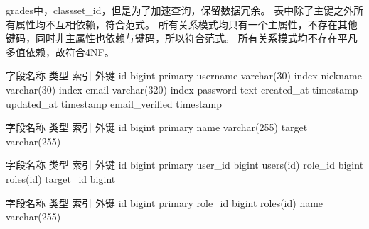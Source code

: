 {}grades中，classset_id，但是为了加速查询，保留数据冗余。\markdownRendererInterblockSeparator
{}\markdownRendererInterblockSeparator
{}表中除了主键之外所有属性均不互相依赖，符合范式。\markdownRendererInterblockSeparator
{}\markdownRendererInterblockSeparator
{}所有关系模式均只有一个主属性，不存在其他键码，同时非主属性也依赖与键码，所以符合范式。\markdownRendererInterblockSeparator
{}\markdownRendererInterblockSeparator
{}所有关系模式均不存在平凡多值依赖，故符合4NF。\markdownRendererInterblockSeparator
{}\markdownRendererInterblockSeparator
{}\markdownRendererInterblockSeparator
{}\begin{center}\markdownRendererInterblockSeparator
{}%
{{字段名称}%
{类型}%
{索引}%
{外键}%
}%
{{id}%
{bigint}%
{primary}%
{}%
}%
{{username}%
{varchar(30)}%
{index}%
{}%
}%
{{nickname}%
{varchar(30)}%
{index}%
{}%
}%
{{email}%
{varchar(320)}%
{index}%
{}%
}%
{{password}%
{text}%
{}%
{}%
}%
{{created\_at}%
{timestamp}%
{}%
{}%
}%
{{updated\_at}%
{timestamp}%
{}%
{}%
}%
{{email\_verified}%
{timestamp}%
{}%
{}%
}%
\markdownRendererInterblockSeparator
{}\end{center}\markdownRendererInterblockSeparator
{}\markdownRendererInterblockSeparator
{}\begin{center}\markdownRendererInterblockSeparator
{}%
{{字段名称}%
{类型}%
{索引}%
{外键}%
}%
{{id}%
{bigint}%
{primary}%
{}%
}%
{{name}%
{varchar(255)}%
{}%
{}%
}%
{{target}%
{varchar(255)}%
{}%
{}%
}%
\markdownRendererInterblockSeparator
{}\end{center}\markdownRendererInterblockSeparator
{}\markdownRendererInterblockSeparator
{}\begin{center}\markdownRendererInterblockSeparator
{}%
{{字段名称}%
{类型}%
{索引}%
{外键}%
}%
{{id}%
{bigint}%
{primary}%
{}%
}%
{{user\_id}%
{bigint}%
{}%
{users(id)}%
}%
{{role\_id}%
{bigint}%
{}%
{roles(id)}%
}%
{{target\_id}%
{bigint}%
{}%
{}%
}%
\markdownRendererInterblockSeparator
{}\end{center}\markdownRendererInterblockSeparator
{}\markdownRendererInterblockSeparator
{}\begin{center}\markdownRendererInterblockSeparator
{}%
{{字段名称}%
{类型}%
{索引}%
{外键}%
}%
{{id}%
{bigint}%
{primary}%
{}%
}%
{{role\_id}%
{bigint}%
{}%
{roles(id)}%
}%
{{name}%
{varchar(255)}%
{}%
{}%
}%
\markdownRendererInterblockSeparator
{}\end{center}\markdownRendererInterblockSeparator
